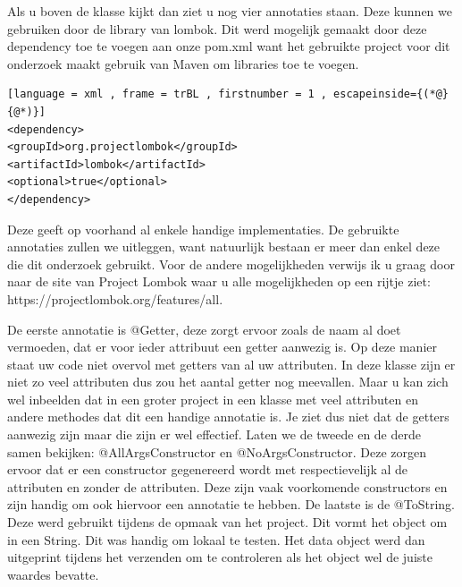 Als u boven de klasse kijkt dan ziet u nog vier annotaties staan. Deze kunnen we gebruiken door de library van lombok. Dit werd mogelijk gemaakt door deze dependency toe te voegen aan onze pom.xml want het gebruikte project voor dit onderzoek maakt gebruik van Maven om libraries toe te voegen.

\begin{lstlisting}[language = xml , frame = trBL , firstnumber = 1 , escapeinside={(*@}{@*)}]
<dependency>
<groupId>org.projectlombok</groupId>
<artifactId>lombok</artifactId>
<optional>true</optional>
</dependency>
\end{lstlisting}

Deze geeft op voorhand al enkele handige implementaties. De gebruikte annotaties zullen we uitleggen, want natuurlijk bestaan er meer dan enkel deze die dit onderzoek gebruikt. Voor de andere mogelijkheden verwijs ik u graag door naar de site van Project Lombok waar u alle mogelijkheden op een rijtje ziet: https://projectlombok.org/features/all. 

De eerste annotatie is @Getter, deze zorgt ervoor zoals de naam al doet vermoeden, dat er voor ieder attribuut een getter aanwezig is. Op deze manier staat uw code niet overvol met getters van al uw attributen. In deze klasse zijn er niet zo veel attributen dus zou het aantal getter nog meevallen. Maar u kan zich wel inbeelden dat in een groter project in een klasse met veel attributen en andere methodes dat dit een handige annotatie is. Je ziet dus niet dat de getters aanwezig zijn maar die zijn er wel effectief. Laten we de tweede en de derde samen bekijken: @AllArgsConstructor en @NoArgsConstructor. Deze zorgen ervoor dat er een constructor gegenereerd wordt met respectievelijk al de attributen en zonder de attributen. Deze zijn vaak voorkomende constructors en zijn handig om ook hiervoor een annotatie te hebben. De laatste  is de @ToString. Deze werd gebruikt tijdens de opmaak van het project. Dit vormt het object om in een String. Dit was handig om lokaal te testen. Het data object werd dan uitgeprint tijdens het verzenden om te controleren als het object wel de juiste waardes bevatte.
